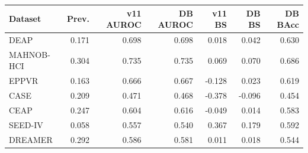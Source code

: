 \begin{tabular}{lrrrrrr}
\toprule
Dataset & Prev. & v11 AUROC & DB AUROC & v11 BS & DB BS & DB BAcc \\
\midrule
DEAP & 0.171 & 0.698 & 0.698 & 0.018 & 0.042 & 0.630 \\
MAHNOB-HCI & 0.304 & 0.735 & 0.735 & 0.069 & 0.070 & 0.686 \\
EPPVR & 0.163 & 0.666 & 0.667 & -0.128 & 0.023 & 0.619 \\
CASE & 0.209 & 0.471 & 0.468 & -0.378 & -0.096 & 0.454 \\
CEAP & 0.247 & 0.604 & 0.616 & -0.049 & 0.014 & 0.583 \\
SEED-IV & 0.058 & 0.557 & 0.540 & 0.367 & 0.179 & 0.592 \\
DREAMER & 0.292 & 0.586 & 0.581 & 0.011 & 0.018 & 0.544 \\
\bottomrule
\end{tabular}
